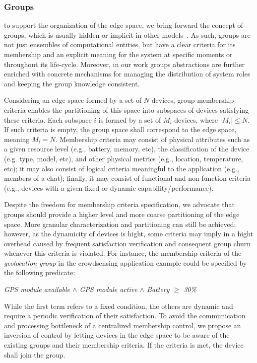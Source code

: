 \subsubsection{Groups} to support the organization of the edge space, we bring forward the concept of groups, which is usually hidden or implicit in other models~\cite{}. As such, groups are not just ensembles of computational entities, but have a clear criteria for its membership and an explicit meaning for the system at specific moments or throughout its life-cycle. Moreover, in our work groups abstractions are further enriched with concrete mechanisms for managing the distribution of system roles and keeping the group knowledge consistent.

Considering an edge space formed by a set of $N$ devices, group membership criteria enables the partitioning of this space into subspaces of devices satisfying these criteria. Each subspace $i$ is formed by a set of $M_i$ devices, where $|M_i| \le N$. If such criteria is empty, the group space shall correspond to the edge space, meaning $M_i = N$. Membership criteria may consist of physical attributes such as a given resource level (e.g., battery, memory, etc), the classification of the device (e.g. type, model, etc), and other physical metrics (e.g., location, temperature, etc); it may also consist of logical criteria meaningful to the application (e.g., members of a chat); finally, it may consist of functional and non-function criteria (e.g., devices with a given fixed or dynamic capability/performance). 

Despite the freedom for membership criteria specification, we advocate that groups should provide a higher level and more coarse partitioning of the edge space. More granular characterization and partitioning can still be achieved; however, as the dynamicity of devices is hight, some criteria may imply in a hight overhead caused by frequent satisfaction verification and consequent group churn whenever this criteria is violated. For instance, the membership criteria of the \textit{geolocation group} in the crowdsensing application example could be specified by the following predicate:
\medskip

\begin{center}
	\small
	\textit{GPS module available $\wedge$ GPS module active $\wedge$ Battery $\ge$ 30\%}
\end{center}
\medskip
\normalsize

While the first term refers to a fixed condition, the others are dynamic and require a periodic verification of their satisfaction. To avoid the communication and processing bottleneck of a centralized membership control, we propose an inversion of control by letting devices in the edge space to be aware of the existing groups and their membership criteria. If the criteria is met, the device shall join the group. 

